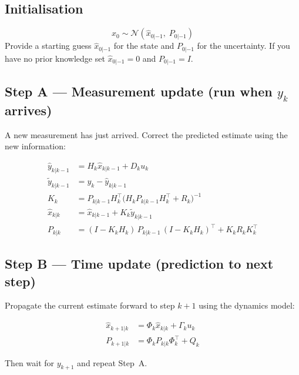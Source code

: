 \documentclass[12pt, a4paper]{article}
\begin{document}
\subsection*{Initialisation}
\[
  x_0 \sim \mathcal{N}(\hat{x}_{0|-1},\; P_{0|-1})
\]
Provide a starting guess $\hat{x}_{0|-1}$ for the state and
$P_{0|-1}$ for the uncertainty.
If you have no prior knowledge set $\hat{x}_{0|-1} = 0$ and
$P_{0|-1} = I$.

\subsection*{Step A --- Measurement update (run when $y_k$ arrives)}

A new measurement has just arrived.
Correct the predicted estimate using the new information:

\begin{align}
  \hat{y}_{k|k-1} &= H_k \hat{x}_{k|k-1} + D_k u_k
  \tag{predicted measurement} \\[4pt]
  \tilde{y}_{k|k-1} &= y_k - \hat{y}_{k|k-1}
  \tag{innovation} \\[4pt]
  K_k &= P_{k|k-1} H_k^\top
    \!\bigl(H_k P_{k|k-1} H_k^\top + R_k\bigr)^{-1}
  \tag{Kalman gain} \\[4pt]
  \hat{x}_{k|k} &= \hat{x}_{k|k-1} + K_k \tilde{y}_{k|k-1}
  \tag{updated state estimate} \\[4pt]
  P_{k|k} &= (I - K_k H_k)\,P_{k|k-1}\,(I - K_k H_k)^\top
    + K_k R_k K_k^\top
  \tag{updated covariance}
\end{align}

\subsection*{Step B --- Time update (prediction to next step)}

Propagate the current estimate forward to step $k{+}1$ using the
dynamics model:

\begin{align}
  \hat{x}_{k+1|k} &= \Phi_k \hat{x}_{k|k} + \Gamma_k u_k
  \tag{predicted state} \\[4pt]
  P_{k+1|k} &= \Phi_k P_{k|k} \Phi_k^\top + Q_k
  \tag{predicted covariance}
\end{align}

Then wait for $y_{k+1}$ and repeat Step~A.
\end{document}
